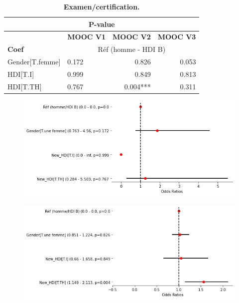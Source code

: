 \documentclass[12pt, a4paper, titlepage, table]{article}
\begin{document}
\begin{table}[H]
	\centering
	\fontsize{12}{20}\selectfont
	\begin{tabular}{|l|l|r|r|}
		\hline
		\multicolumn{4}{|c|}{\textbf{P-value}}\\
		\hline
		\multicolumn{1}{|c|}{\textbf{}}&
		\multicolumn{1}{c|}{\textbf{MOOC V1}}&
		\multicolumn{1}{c|}{\textbf{MOOC V2}}&
		\multicolumn{1}{c|}{\textbf{MOOC V3}}\\
		\hline
		\textbf{Coef}&
		\multicolumn{3}{c|}{Réf (homme - HDI B)}\\
		\hline
		Gender[T.femme]&	0.172&	0.826&	0.053\\
		HDI[T.I]&		0.999&	0.849&	0.813\\
		HDI[T.TH]&		0.767&	0.004***&	0.311\\
		\hline
	\end{tabular}
	\caption{\textbf{Examen/certification.}}
\end{table}

\begin{figure}[H]
	\centering
	\includegraphics[width=1\textwidth]{../../graph/forestplot_V0_binomiale.png}
\end{figure}

\begin{figure}[H]
	\centering
	\includegraphics[width=1\textwidth]{../../graph/forestplot_V1_binomiale.png}
\end{figure}
\end{document}
